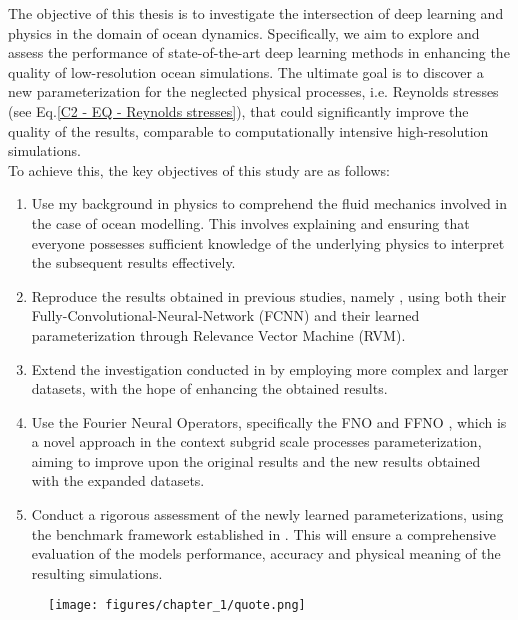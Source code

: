 \newpage


The objective of this thesis is to investigate the intersection of deep learning and physics in the domain of ocean dynamics. Specifically, we aim to explore and assess the performance of state-of-the-art deep learning methods in enhancing the quality of low-resolution ocean simulations. The ultimate goal is to discover a new parameterization for the neglected physical processes, i.e. Reynolds stresses (see Eq.\ref{C2 - EQ - Reynolds stresses}), that could significantly improve the quality of the results, comparable to computationally intensive high-resolution simulations.\\

To achieve this, the key objectives of this study are as follows:

\vspace{0.4em}

\begin{enumerate}
\item Use my background in physics to comprehend the fluid mechanics involved in the case of ocean modelling. This involves explaining and ensuring that everyone possesses sufficient knowledge of the underlying physics to interpret the subsequent results effectively.

\vspace{0.3em}

\item Reproduce the results obtained in previous studies, namely \cite{FCNN1, ClosureDataDrivenZanna, Benchmarking}, using both their Fully-Convolutional-Neural-Network (FCNN) and their learned parameterization through Relevance Vector Machine (RVM).

\vspace{0.3em}

\item Extend the investigation conducted in \cite{Benchmarking} by employing more complex and larger datasets, with the hope of enhancing the obtained results.

\vspace{0.3em}

\item Use the Fourier Neural Operators, specifically the FNO \citep{FNO} and FFNO \citep{FFNO}, which is a novel approach in the context subgrid scale processes parameterization, aiming to improve upon the original results and the new results obtained with the expanded datasets.

\vspace{0.3em}

\item Conduct a rigorous assessment of the newly learned parameterizations, using the benchmark framework established in \cite{Benchmarking}. This will ensure a comprehensive evaluation of the models performance, accuracy and physical meaning of the resulting simulations.
\end{enumerate}

\begin{figure}[!b]
    \centering
    \texttt{[image: figures/chapter\_1/quote.png]}
    \label{C1 - FIG - Feynman}
\end{figure}













